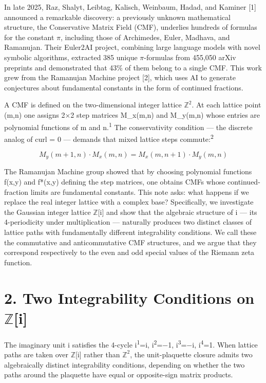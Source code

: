 \documentclass[11pt]{article}
\begin{document}
In late 2025, Raz, Shalyt, Leibtag, Kalisch, Weinbaum, Hadad, and
Kaminer {[}1{]} announced a remarkable discovery: a previously unknown
mathematical structure, the Conservative Matrix Field (CMF), underlies
hundreds of formulas for the constant \(\pi\), including those of
Archimedes, Euler, Madhava, and Ramanujan. Their Euler2AI project,
combining large language models with novel symbolic algorithms,
extracted 385 unique \(\pi\)-formulas from 455,050 arXiv preprints and
demonstrated that 43\% of them belong to a single CMF. This work grew
from the Ramanujan Machine project {[}2{]}, which uses AI to generate
conjectures about fundamental constants in the form of continued
fractions.

A CMF is defined on the two-dimensional integer lattice
\(\mathbb{Z}^{2}\). At each lattice point (m,n) one assigns 2\(\times\)2
step matrices M\_x(m,n) and M\_y(m,n) whose entries are polynomial
functions of m and n.\textsuperscript{1} The conservativity condition
--- the discrete analog of curl = 0 --- demands that mixed lattice steps
commute:\textsuperscript{2}

\[M_y(m+1,n) \cdot M_x(m,n) = M_x(m,n+1) \cdot M_y(m,n)\]

The Ramanujan Machine group showed that by choosing polynomial functions
f(x,y) and f*(x,y) defining the step matrices, one obtains CMFs whose
continued-fraction limits are fundamental constants. This note asks:
what happens if we replace the real integer lattice with a complex base?
Specifically, we investigate the Gaussian integer lattice
\(\mathbb{Z}\){[}i{]} and show that the algebraic structure of i --- its
4-periodicity under multiplication --- naturally produces two distinct
classes of lattice paths with fundamentally different integrability
conditions. We call these the commutative and anticommutative CMF
structures, and we argue that they correspond respectively to the even
and odd special values of the Riemann zeta function.

\hypertarget{two-integrability-conditions}{%
\section{2. Two Integrability Conditions on
\(\mathbb{Z}\){[}i{]}}\label{two-integrability-conditions}}

The imaginary unit i satisfies the 4-cycle i\textsuperscript{1}=i,
i\textsuperscript{2}=−1, i\textsuperscript{3}=−i,
i\textsuperscript{4}=1. When lattice paths are taken over
\(\mathbb{Z}\){[}i{]} rather than \(\mathbb{Z}^{2}\), the
unit-plaquette closure admits two algebraically distinct integrability
conditions, depending on whether the two paths around the plaquette
have equal or opposite-sign matrix products.
\end{document}
